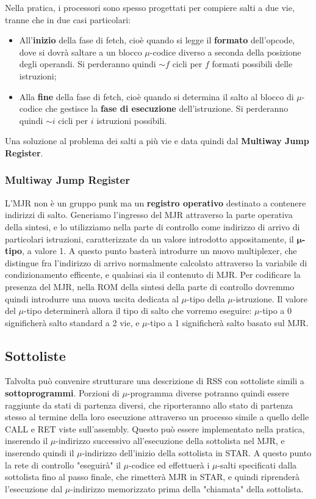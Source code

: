 \documentclass[a4paper,11pt]{article}
\begin{document}
Nella pratica, i processori sono spesso progettati per compiere salti a due vie, tranne che in due casi particolari:
\begin{itemize}
	\item All'\textbf{inizio} della fase di fetch, cioè quando si legge il \textbf{formato} dell'opcode, dove si dovrà saltare a un blocco $\mu$-codice diverso a seconda della posizione degli operandi.
		Si perderanno quindi $\sim f$ cicli per $f$ formati possibili delle istruzioni;
	\item Alla \textbf{fine} della fase di fetch, cioè quando si determina il salto al blocco di $\mu$-codice che gestisce la \textbf{fase di esecuzione} dell'istruzione.
		Si perderanno quindi $\sim i$ cicli per $i$ istruzioni possibili.
\end{itemize}
Una soluzione al problema dei salti a più vie e data quindi dal \textbf{Multiway Jump Register}.

\subsubsection{Multiway Jump Register}
L'MJR non è un gruppo punk ma un \textbf{registro operativo} destinato a contenere indirizzi di salto.
Generiamo l'ingresso del MJR attraverso la parte operativa della sintesi, e lo utilizziamo nella parte di controllo come indirizzo di arrivo di particolari istruzioni, caratterizzate da un valore introdotto appositamente, il $\boldsymbol{\mu}$\textbf{-tipo}, a valore 1.
A questo punto basterà introdurre un nuovo multiplexer, che distingue fra l'indirizzo di arrivo normalmente calcolato attraverso la variabile di condizionamento efficente, e qualsiasi sia il contenuto di MJR.
Per codificare la presenza del MJR, nella ROM della sintesi della parte di controllo dovremmo quindi introdurre una nuova uscita dedicata al $\mu$-tipo della $\mu$-istruzione.
Il valore del $\mu$-tipo determinerà allora il tipo di salto che vorremo eseguire: $\mu$-tipo a 0 significherà salto standard a 2 vie, e $\mu$-tipo a 1 significherà salto basato sul MJR.

\subsection{Sottoliste}
Talvolta può convenire strutturare una descrizione di RSS con sottoliste simili a \textbf{sottoprogrammi}.
Porzioni di $\mu$-programma diverse potranno quindi essere raggiunte da stati di partenza diversi, che riporteranno allo stato di partenza stesso al termine della loro esecuzione attraverso un processo simile a quello delle CALL e RET viste sull'assembly.
Questo può essere implementato nella pratica, inserendo il $\mu$-indirizzo successivo all'esecuzione della sottolista nel MJR, e inserendo quindi il $\mu$-indirizzo dell'inizio della sottolista in STAR.
A questo punto la rete di controllo "eseguirà" il $\mu$-codice ed effettuerà i $\mu$-salti specificati dalla sottolista fino al passo finale, che rimetterà MJR in STAR, e quindi riprenderà l'esecuzione dal $\mu$-indirizzo memorizzato prima della "chiamata" della sottolista.
\end{document}
